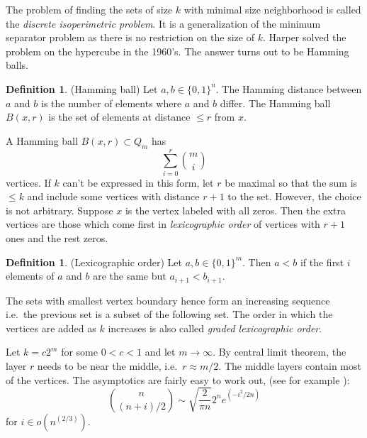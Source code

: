 \documentclass[a4paper,12pt]{book}
\theoremstyle{plain}
\theoremstyle{definition}
\newtheorem{definition}[theorem]{Definition}
\begin{document}
The problem of finding the sets of size $k$ with minimal size neighborhood is 
called the \textit{discrete isoperimetric problem}. It is a generalization of 
the minimum separator problem as there is no restriction on the size of $k$. 
Harper \cite{Harp} solved the problem on the hypercube in the 1960's. The 
answer turns out to be Hamming balls.

\begin{definition}
 (Hamming ball) Let $a,b \in \{0,1\}^n$. The Hamming distance between $a$ and 
$b$ is the number of elements where $a$ and $b$ differ. The Hamming ball 
$B(x,r)$ is the set of elements at distance $\leq r$ from $x$.
\end{definition}

A Hamming ball $B(x,r) \subset Q_m$ has 
\begin{equation}
 \sum_{i=0}^r {m \choose i}
\end{equation}
vertices. If $k$ can't be expressed in this form, let $r$ be maximal so that 
the sum is $\leq k$ and include some vertices with distance $r+1$ to the set. 
However, the choice is not arbitrary. Suppose $x$ is the vertex labeled with 
all zeros. Then the extra vertices are those which come first in 
\textit{lexicographic order} of vertices with $r+1$ ones and the rest zeros.
\begin{definition}
 (Lexicographic order) Let $a,b \in \{0,1\}^m$. Then $a<b$ if the first $i$ 
elements of $a$ and $b$ are the same but $a_{i+1} < b_{i+1}$.
\end{definition}
The sets with smallest vertex boundary hence form an increasing sequence i.e.\ 
the previous set is a subset of the following set. The order in which the 
vertices are added as $k$ increases is also called \textit{graded lexicographic 
order}.

Let $k = c2^m$ for some $0<c<1$ and let $m \rightarrow \infty$. By central limit theorem, 
the layer $r$ needs to be near the middle, i.e.\ $r\approx m/2$. The middle layers contain most of the vertices.
The asymptotics are fairly easy to work out, (see for example \cite{Spencer:Asymptopia}):
\begin{equation}
\binom{n}{(n+i)/2} \sim \sqrt{\frac{2}{\pi n}} 2^n e^{\left(-i^2/2n\right)}  
\end{equation}
for $i \in o(n^{(2/3)})$.

\end{document}
